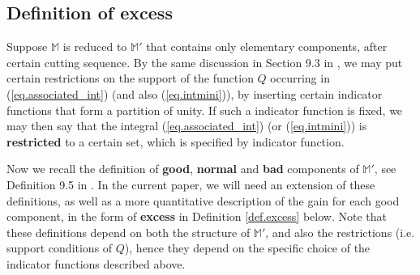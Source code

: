 \documentclass[10pt, reqno]{amsart}
\newcommand{\Mb}{\mathbb M}
\theoremstyle{definition}
\theoremstyle{remark}
\numberwithin{equation}{section}
\begin{document}
\subsection{Definition of excess}\label{sec.summary} Suppose $\Mb$ is reduced to $\Mb'$ that contains only elementary components, after certain cutting sequence. By the same discussion in Section 9.3 in \cite{DHM24}, we may put certain restrictions on the support of the function $Q$ occurring in (\ref{eq.associated_int}) (and also (\ref{eq.intmini})), by inserting certain indicator functions that form a partition of unity. If such a indicator function is fixed, we may then say that the integral (\ref{eq.associated_int}) (or (\ref{eq.intmini})) is \textbf{restricted} to a certain set, which is specified by indicator function.

Now we recall the definition of \textbf{good}, \textbf{normal} and \textbf{bad} components of $\Mb'$, see Definition 9.5 in \cite{DHM24}. In the current paper, we will need an extension of these definitions, as well as a more quantitative description of the gain for each good component, in the form of \textbf{excess} in Definition \ref{def.excess} below. Note that these definitions depend on both the structure of $\Mb'$, and also the restrictions (i.e. support conditions of $Q$), hence they depend on the specific choice of the indicator functions described above.
\end{document}
